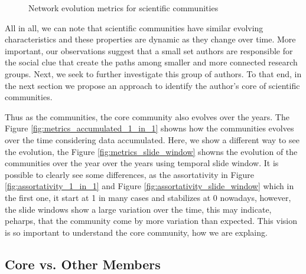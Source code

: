 \begin{figure}[!htb]
\begin{center}
{  }%
  \end{center}
  \caption{Network evolution metrics for scientific communities}
  \label{fig:metrics}
\end{figure}

All in all, we can note that scientific communities have similar evolving characteristics and these properties are dynamic as they change over time.  More important, our
observations suggest that a small set authors are responsible for the social clue that create the paths among smaller and more connected research groups. Next, we seek to further
investigate this group of authors. To that end, in the next section we propose an approach to identify the author's core of scientific communities.

Thus as the communities, the core community also evolves over the years. The Figure \ref{fig:metrics_accumulated_1_in_1}
showns how the communities evolves over the time considering data accumulated. Here, we show a different way to see the evolution,
the Figure \ref{fig:metrics_slide_window} showns the evolution of the communities over the year over the years using temporal slide 
window. It is possible to clearly see some differences, as the assortativity in Figure \ref{fig:assortativity_1_in_1}
and Figure \ref{fig:assortativity_slide_window} which in the first one, it start at 1 in many cases and stabilizes at 0 
nowadays, however, the slide windows show a large variation over the time, this may indicate, peharps, that the community come by
more variation than expected. This vision is so important to understand the core community, how we are explaing.\\
\fi 

\subsection{Core vs. Other Members}
\label{sub:vs}

